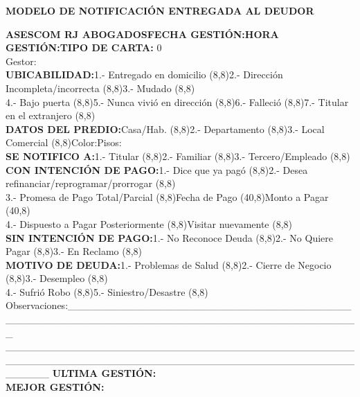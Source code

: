 \begin{center}
\textbf{ MODELO DE NOTIFICACIÓN ENTREGADA AL DEUDOR}
\end{center}
{\noindent
\textbf{ASESCOM RJ ABOGADOS}\hfill \textbf{FECHA GESTIÓN:}\hfill \textbf{HORA GESTIÓN:}\hfill \textbf{TIPO DE CARTA:} {0}\space\\
Gestor:\\
\textbf{UBICABILIDAD:}\hfill 1.- Entregado en domicilio \framebox(8,8){}\hfill 2.- Dirección Incompleta/incorrecta \framebox(8,8){}\hfill 3.- Mudado \framebox(8,8){}\hfill \space\\
4.- Bajo puerta \framebox(8,8){}\hfill 5.- Nunca vivió en dirección \framebox(8,8){}\hfill 6.- Falleció \framebox(8,8){}\hfill 7.- Titular en el extranjero \framebox(8,8){}\hfill \space\\
\textbf{DATOS DEL PREDIO:}\hfill Casa/Hab. \framebox(8,8){}\hfill 2.- Departamento \framebox(8,8){}\hfill 3.- Local Comercial \framebox(8,8){}\hfill Color:\hfill Pisos:\hfill \space\\
\textbf{SE NOTIFICO A:}\hfill 1.- Titular \framebox(8,8){}\hfill 2.- Familiar \framebox(8,8){}\hfill 3.- Tercero/Empleado \framebox(8,8){}\hfill \space\\ 	
\textbf{CON INTENCIÓN DE PAGO:}\hfill 1.- Dice que ya pagó \framebox(8,8){}\hfill 2.- Desea refinanciar/reprogramar/prorrogar \framebox(8,8){}\hfill \space\\
3.- Promesa de Pago Total/Parcial \framebox(8,8){}\hfill Fecha de Pago \framebox(40,8){}\hfill Monto a Pagar \framebox(40,8){}\hfill \space\\
4.- Dispuesto a Pagar Posteriormente \framebox(8,8){}\hfill Visitar nuevamente \framebox(8,8){}\hfill \space\\
\textbf{SIN INTENCIÓN DE PAGO:}\hfill 1.- No Reconoce Deuda \framebox(8,8){}\hfill 2.- No Quiere Pagar \framebox(8,8){}\hfill 3.- En Reclamo \framebox(8,8){}\hfill \space\\
\textbf{MOTIVO DE DEUDA:}\hfill 1.- Problemas de Salud \framebox(8,8){}\hfill 2.- Cierre de Negocio \framebox(8,8){}\hfill 3.- Desempleo \framebox(8,8){}\hfill \space\\
4.- Sufrió Robo \framebox(8,8){}\hfill 5.- Siniestro/Desastre \framebox(8,8){}\hfill \space\\
Observaciones:\_\_\_\_\_\_\_\_\_\_\_\_\_\_\_\_\_\_\_\_\_\_\_\_\_\_\_\_\_\_\_\_\_\_\_\_\_\_\_\_\_\_\_\_\_\_\_\_\_\_\_\_\_\_\_\_\_\_\_\_\_\_\_\_\_\_\_\_\_\_\_\_\_\_\_\_\_\_\_\_\_\_\_\_\_\_\_\_\\
\_\_\_\_\_\_\_\_\_\_\_\_\_\_\_\_\_\_\_\_\_\_\_\_\_\_\_\_\_\_\_\_\_\_\_\_\_\_\_\_\_\_\_\_\_\_\_\_\_\_\_\_\_\_\_\_\_\_\_\_\_\_\_\_\_\_\_\_\_\_\_\_\_\_\_\_\_\_\_\_\_\_\_\_\_\_\_\_\_\_\_\_\_\_\_\_\_\_\_\_\_\_
\textbf{ULTIMA GESTIÓN:}\\
\textbf{MEJOR GESTIÓN:}
}










